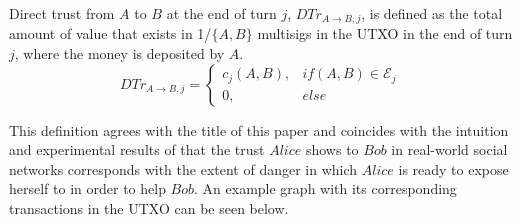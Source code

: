 \documentclass[11pt]{llncs}
\theoremstyle{definition}
\begin{document}
     \begin{definition}
        Direct trust from $A$ to $B$ at the end of turn $j$, $DTr_{A \rightarrow B, j}$, is defined as the total amount of
        value that exists in 1/$\{A,B\}$ multisigs in the UTXO in the end of turn $j$, where the money is deposited by $A$.
        \begin{equation}
           DTr_{A \rightarrow B, j} =
              \begin{cases}
                 c_j\left(A, B\right), & if \left(A, B\right) \in \mathcal{E}_j \\
                 0, & else
              \end{cases}
        \end{equation}
     \end{definition}
     This definition agrees with the title of this paper and coincides with the intuition and experimental results of
     \cite{socialcollateral} that the trust $Alice$ shows to $Bob$ in real-world social networks corresponds with the extent
     of danger in which $Alice$ is ready to expose herself to in order to help $Bob$. An example graph with its corresponding
     transactions in the UTXO can be seen below.
\end{document}
